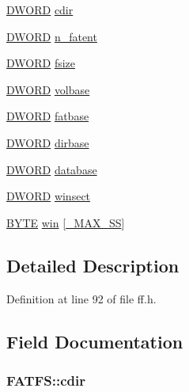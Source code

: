\begin{DoxyCompactItemize}
\item 
\hyperlink{integer_8h_ad342ac907eb044443153a22f964bf0af}{D\+W\+O\+RD} \hyperlink{structFATFS_a217d0ce0c8cec84aa7f0c142679412c6}{cdir}
\item 
\hyperlink{integer_8h_ad342ac907eb044443153a22f964bf0af}{D\+W\+O\+RD} \hyperlink{structFATFS_a8da50eeba6469bc20d60ca0cf9a1307c}{n\+\_\+fatent}
\item 
\hyperlink{integer_8h_ad342ac907eb044443153a22f964bf0af}{D\+W\+O\+RD} \hyperlink{structFATFS_a53e9560659f14e66f306c2c444198bf3}{fsize}
\item 
\hyperlink{integer_8h_ad342ac907eb044443153a22f964bf0af}{D\+W\+O\+RD} \hyperlink{structFATFS_a8f0ca578755749d204f59dc83f1a7649}{volbase}
\item 
\hyperlink{integer_8h_ad342ac907eb044443153a22f964bf0af}{D\+W\+O\+RD} \hyperlink{structFATFS_a848fba02c4aabe02ef2984e578f33d64}{fatbase}
\item 
\hyperlink{integer_8h_ad342ac907eb044443153a22f964bf0af}{D\+W\+O\+RD} \hyperlink{structFATFS_a3f72fd998dbcce4652a85a81fe944bc4}{dirbase}
\item 
\hyperlink{integer_8h_ad342ac907eb044443153a22f964bf0af}{D\+W\+O\+RD} \hyperlink{structFATFS_a5b6c0bc2e9fd2ae8ef714210a74a2d5d}{database}
\item 
\hyperlink{integer_8h_ad342ac907eb044443153a22f964bf0af}{D\+W\+O\+RD} \hyperlink{structFATFS_ac60e69c00e6bf7c25febfbac4dc1476b}{winsect}
\item 
\hyperlink{integer_8h_a4ae1dab0fb4b072a66584546209e7d58}{B\+Y\+TE} \hyperlink{structFATFS_a7cc35a593465e727ab87723c14610644}{win} \mbox{[}\hyperlink{ffconf_8h_ac271b697378912f17132cb9c7d0de024}{\+\_\+\+M\+A\+X\+\_\+\+SS}\mbox{]}
\end{DoxyCompactItemize}


\subsection{Detailed Description}


Definition at line 92 of file ff.\+h.



\subsection{Field Documentation}
\subsubsection[{\texorpdfstring{cdir}{cdir}}]{ F\+A\+T\+F\+S\+::cdir}\hypertarget{structFATFS_a217d0ce0c8cec84aa7f0c142679412c6}{}\label{structFATFS_a217d0ce0c8cec84aa7f0c142679412c6}



